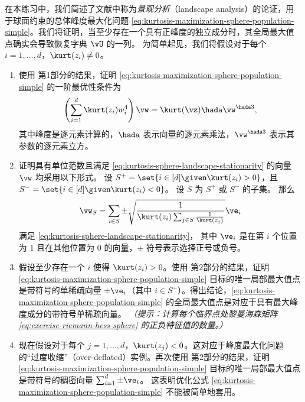 \documentclass[../../book-main_zh.tex]{subfiles}
\begin{document}
\begin{exercise}\label{exercise:kurtosis-sphere-landscape}
    在本练习中，我们简述了文献中称为\textit{景观分析}（landscape analysis）的论证，用于球面约束的总体峰度最大化问题
    \eqref{eq:kurtosis-maximization-sphere-population-simple}。我们将证明，当至少存在一个具有正峰度的独立成分时，其全局最大值点确实会导致恢复字典
    $\vU$ 的一列。
    为简单起见，我们将假设对于每个 $i = 1, \dots, d$，$\kurt(z_i) \neq 0$。
    \begin{enumerate}
        \item 使用  第1部分的结果，证明
            \eqref{eq:kurtosis-maximization-sphere-population-simple} 的一阶最优性条件为
            \begin{equation}\label{eq:kurtosis-sphere-landscape-stationarity}
                \left(\sum_{i=1}^d \kurt(z_i) w_i^4 \right)
                \vw = \kurt(\vz) \hada \vw^{\hada 3},
            \end{equation}
            其中峰度是逐元素计算的，$\hada$
            表示向量的逐元素乘法，$\vw^{\hada 3}$ 表示其参数的逐元素立方。
        \item 证明具有单位范数且满足 \eqref{eq:kurtosis-sphere-landscape-stationarity}
            的向量 $\vw$ 均采用以下形式。
            设 $S^+ = \set{i \in [d] \given \kurt(z_i) > 0}$，且
            $S^- = \set{i \in [d] \given \kurt(z_i) < 0}$。
            设 $S$ 为 $S^+$ 或 $S^-$ 的子集。
            那么
            \begin{equation}\label{eq:kurtosis-sphere-landscape-cps}
                \vw_S = \sum_{i \in S} \pm \sqrt{\frac{1}{\kurt(z_i)
                \sum_{j \in S} \frac{1}{\kurt(z_j)}}} \ve_i
            \end{equation}
            满足 \eqref{eq:kurtosis-sphere-landscape-stationarity}，
            其中 $\ve_i$ 是在第 $i$ 个位置为 $1$ 且在其他位置为 $0$ 的向量，$\pm$ 符号表示选择正号或负号。
        \item 假设至少存在一个 $i$ 使得
            $\kurt(z_i) > 0$。使用  第2部分的结果，证明
            \eqref{eq:kurtosis-maximization-sphere-population-simple}
            目标的唯一局部最大值点是带符号的单稀疏向量 $\pm \ve_i$（其中 $i \in
            S^+$）。得出结论，\eqref{eq:kurtosis-maximization-sphere-population-simple}
            的全局最大值点是对应于具有最大峰度成分的带符号单稀疏向量。 %
            \textit{（提示：计算每个临界点处黎曼海森矩阵
            \eqref{eq:exercise-riemann-hess-sphere} 的正负特征值的数量。）}
        \item 现在假设对于每个 $j =1,
            \dots, d$，$\kurt(z_j) <
            0$。这对应于峰度最大化问题的“过度收缩”（over-deflated）实例。再次使用
             第2部分的结果，证明
            \eqref{eq:kurtosis-maximization-sphere-population-simple}
            目标的唯一局部最大值点是带符号的稠密向量 $\sum_{i=1}^d \pm \ve_i$。
            这表明优化公式
            \eqref{eq:kurtosis-maximization-sphere-population-simple}
            不能被简单地套用。
    \end{enumerate}
\end{exercise}
\end{document}
